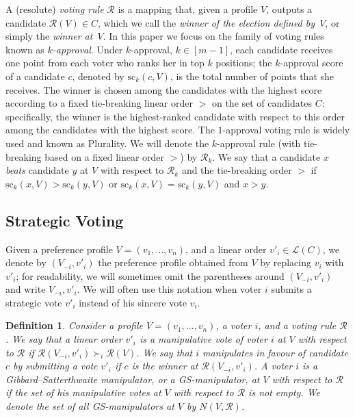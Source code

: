 \documentclass[11pt]{article}
\newtheorem{definition}{Definition}
\newcommand{\calR}{\mathcal{R}}
\newcommand{\calL}{\mathcal{L}}
\newcommand{\scr}{\mathrm{sc}}
\begin{document}

A (resolute) {\em voting rule} $\calR$ is a mapping that, given a profile $V$, outputs a candidate ${\calR(V)\in C}$,
which we call the {\em winner of the election defined by~$V$}, or simply the {\em winner at~$V$}. 
In this paper we focus on
the family of voting rules known as {\em $k$-approval}.
Under $k$-approval, $k\in [m-1]$, each candidate receives one point from each voter who ranks
her in top $k$ positions; the $k$-approval score of a candidate $c$, denoted by $\scr_k(c, V)$,
is the total number of points that she receives.
The winner is chosen among the candidates with the highest score
according to a fixed tie-breaking  linear order $>$ on the set of candidates $C$: specifically, the winner
is the highest-ranked candidate with respect to this order among the candidates with the highest score.
The $1$-approval voting rule is widely used and known as Plurality. We will denote the $k$-approval rule
(with tie-breaking based on a fixed linear order $>$) by $\calR_k$.
We say that a candidate $x$ {\em beats} candidate $y$ at $V$ with respect to $\calR_k$ and the tie-breaking order $>$
if $\scr_k(x, V) > \scr_k(y, V)$ or $\scr_k(x, V)=\scr_k(y, V)$ and $x>y$.

\subsection{Strategic Voting}\label{sec:strategic}

Given a preference profile $V=(v_1, \dots, v_n)$, and a linear order $v'_i\in\calL(C)$, we denote by $(V_{-i}, v'_i)$
the preference profile obtained from $V$ by replacing $v_i$ with $v'_i$; for readability,
we will sometimes omit the parentheses around $(V_{-i}, v'_i)$ and write $V_{-i}, v'_i$.
We will often use this notation when voter $i$ submits a strategic vote $v'_i$ instead of his sincere vote $v_i$.


\begin{definition}\label{def:GS}
Consider a profile $V=(v_1, \dots, v_n)$, a voter $i$, and a voting rule $\calR$. 
We say that a linear order $v'_i$ is a {\em manipulative vote} of voter $i$ at $V$
with respect to $\calR$ if $\calR(V_{-i}, v'_i)\succ_i \calR(V)$.
We say that $i$ manipulates {\em in favour of candidate $c$} by submitting a vote $v'_i$ if
$c$ is the winner at $\calR(V_{-i}, v'_i)$. 
A voter $i$ is a {\em Gibbard--Sat\-ter\-thwaite manipulator}, or a {\em GS-manipula\-tor}, 
at $V$ with respect to $\calR$ if the set of his manipulative votes at $V$
with respect to $\calR$ is not empty.
We denote the set of all GS-manipulators at $V$ by $N(V, \calR)$.
\end{definition}
\end{document}
